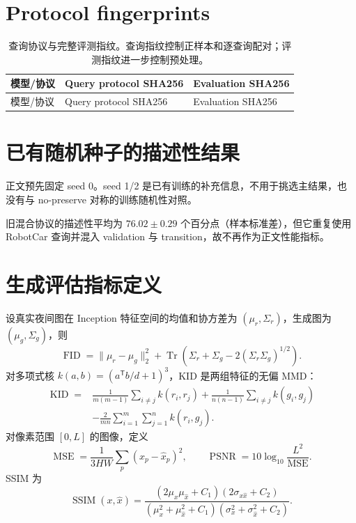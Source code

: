 \documentclass[UTF8,a4paper,11pt]{ctexart}
\begin{document}
\section{Protocol fingerprints}
\begin{longtable}{p{4.2cm}p{5.5cm}p{5.5cm}}
\caption{查询协议与完整评测指纹。查询指纹控制正样本和逐查询配对；评测指纹进一步控制预处理。}\\
\toprule
模型/协议 & Query protocol SHA256 & Evaluation SHA256\\
\midrule
\endfirsthead
\toprule
模型/协议 & Query protocol SHA256 & Evaluation SHA256\\
\midrule
\endhead

\end{longtable}

\section{已有随机种子的描述性结果}
正文预先固定 seed 0。seed 1/2 是已有训练的补充信息，不用于挑选主结果，也没有与 no-preserve 对称的训练随机性对照。
\begin{table}[htbp]
\centering
\caption{day+fake+preserve 已有 seed 的 R@1（\%）。宏平均只含 RC、SVOX-N 与 Tokyo-N。}
\label{tab:seed-stability}
\end{table}
旧混合协议的描述性平均为 $76.02\pm0.29$ 个百分点（样本标准差），但它重复使用 RobotCar 查询并混入 validation 与 transition，故不再作为正文性能指标。

\section{生成评估指标定义}
设真实夜间图在 Inception 特征空间的均值和协方差为 $(\mu_r,\Sigma_r)$，生成图为 $(\mu_g,\Sigma_g)$，则
\[
 \operatorname{FID}=\lVert\mu_r-\mu_g\rVert_2^2+
 \operatorname{Tr}\left(\Sigma_r+\Sigma_g-2(\Sigma_r\Sigma_g)^{1/2}\right).
\]
对多项式核 $k(a,b)=(a^{\mathsf T}b/d+1)^3$，KID 是两组特征的无偏 MMD：
\begin{align}
 \operatorname{KID}={}&\frac1{m(m-1)}\sum_{i\ne j}k(r_i,r_j)
 +\frac1{n(n-1)}\sum_{i\ne j}k(g_i,g_j)\\
 &-\frac2{mn}\sum_{i=1}^m\sum_{j=1}^n k(r_i,g_j).
\end{align}
对像素范围 $[0,L]$ 的图像，定义
\[
 \operatorname{MSE}=\frac1{3HW}\sum_p(x_p-\hat x_p)^2,
 \qquad \operatorname{PSNR}=10\log_{10}\frac{L^2}{\operatorname{MSE}}.
\]
SSIM 为
\[
 \operatorname{SSIM}(x,\hat x)=
 \frac{(2\mu_x\mu_{\hat x}+C_1)(2\sigma_{x\hat x}+C_2)}
 { (\mu_x^2+\mu_{\hat x}^2+C_1)(\sigma_x^2+\sigma_{\hat x}^2+C_2)}.
\]
\end{document}
